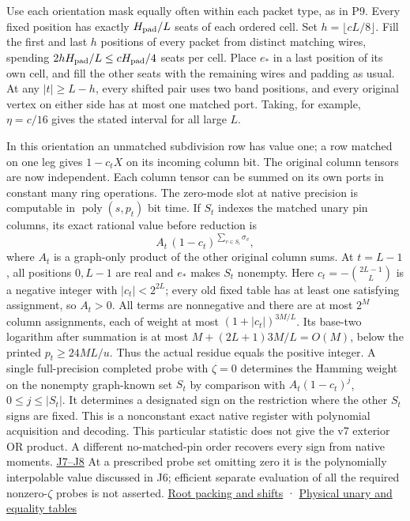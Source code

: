 \documentclass[
  11pt,
]{article}
\begin{document}
Use each orientation mask equally often within each packet type, as in
P9. Every fixed position has exactly \(H_{\rm pad}/L\) seats of each
ordered cell. Set \(h=\lfloor cL/8\rfloor\). Fill the first and last
\(h\) positions of every packet from distinct matching wires, spending
\(2hH_{\rm pad}/L\le c H_{\rm pad}/4\) seats per cell. Place \(e_*\) in
a last position of its own cell, and fill the other seats with the
remaining wires and padding as usual. At any \(|t|\ge L-h\), every
shifted pair uses two band positions, and every original vertex on
either side has at most one matched port. Taking, for example,
\(\eta=c/16\) gives the stated interval for all large \(L\).

In this orientation an unmatched subdivision row has value one; a row
matched on one leg gives \(1-c_tX\) on its incoming column bit. The
original column tensors are now independent. Each column tensor can be
summed on its own ports in constant many ring operations. The zero-mode
slot at native precision is computable in \(\operatorname{poly}(s,p_t)\)
bit time. If \(S_t\) indexes the matched unary pin columns, its exact
rational value before reduction is \[
                A_t\, (1-c_t)^{\sum_{v\in S_t}\sigma_v},
\] where \(A_t\) is a graph-only product of the other original column
sums. At \(t=L-1\), all positions \(0,L-1\) are real and \(e_*\) makes
\(S_t\) nonempty. Here \(c_t=-\binom{2L-1}{L}\) is a negative integer
with \(|c_t|<2^{2L}\); every old fixed table has at least one satisfying
assignment, so \(A_t>0\). All terms are nonnegative and there are at
most \(2^M\) column assignments, each of weight at most
\((1+|c_t|)^{3M/L}\). Its base-two logarithm after summation is at most
\(M+(2L+1)3M/L=O(M)\), below the printed \(p_t\ge24ML/u\). Thus the
actual residue equals the positive integer. A single full-precision
completed probe with \(\zeta=0\) determines the Hamming weight on the
nonempty graph-known set \(S_t\) by comparison with \(A_t(1-c_t)^j\),
\(0\le j\le|S_t|\). It determines a designated sign on the restriction
where the other \(S_t\) signs are fixed. This is a nonconstant exact
native register with polynomial acquisition and decoding. This
particular statistic does not give the v7 exterior OR product. A
different no-matched-pin order recovers every sign from native moments.
\hyperref[v9-section-moment-escape]{J7--J8} At a prescribed probe set
omitting zero it is the polynomially interpolable value discussed in J6;
efficient separate evaluation of all the required nonzero-\(\zeta\)
probes is not asserted.
\href{https://github.com/openai/math/blob/main/preprints/The-Exponential-Time-Hypothesis-is-False-October-25-2026/build/quantitative-contraction.tex\#L114}{Root
packing and shifts} ·
\href{https://github.com/openai/math/blob/main/preprints/The-Exponential-Time-Hypothesis-is-False-October-25-2026/build/quantitative-reduction.tex\#L65}{Physical
unary and equality tables}
\end{document}
